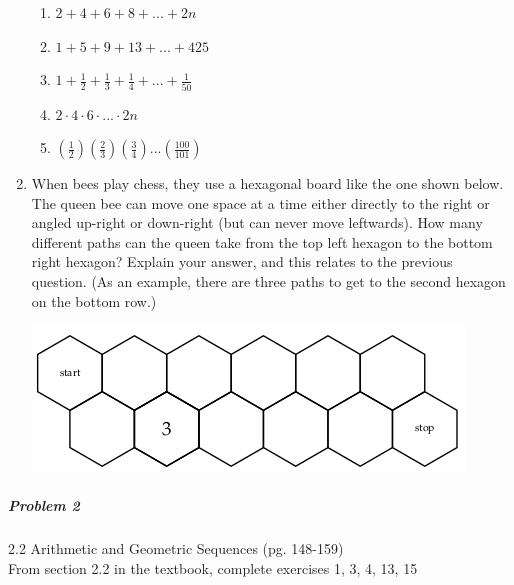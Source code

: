 \documentclass[11pt]{article} %
\newcommand\setItemNumber[1]{\setcounter{enumi}{\numexpr#1-1\relax}}
\begin{document}
\begin{enumerate}
\begin{enumerate}
                \item $2 + 4 + 6 + 8 + ... + 2n$
                \item $1 + 5 + 9 + 13 + ... + 425$
                \item $1 + \frac{1}{2} + \frac{1}{3} + \frac{1}{4} + ... + \frac{1}{50}$
                \item $2\cdot 4\cdot 6\cdot ... \cdot2n$
                \item $(\frac{1}{2})(\frac{2}{3})(\frac{3}{4})...(\frac{100}{101})$
            \end{enumerate}

            \setItemNumber{18}
            \item When bees play chess, they use a hexagonal board like the one shown below. The queen bee can move one space at a time either directly to the right or angled up-right or down-right (but can never move leftwards). How many different paths can the queen take from the top left hexagon to the bottom right hexagon? Explain your answer, and this relates to the previous question. (As an example, there are three paths to get to the second hexagon on the bottom row.)

            \begin{center}
            \includegraphics[width=.5\textwidth]{hw6_graphic1}
            \end{center}
	
        \end{enumerate}

	\subparagraph{Problem 2} 2.2 Arithmetic and Geometric Sequences (pg. 148-159)\\
	
		From section 2.2 in the textbook, complete exercises 1, 3, 4, 13, 15
	
\end{document}
